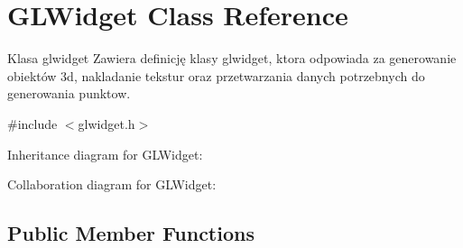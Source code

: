 \hypertarget{class_g_l_widget}{}\section{G\+L\+Widget Class Reference}
\label{class_g_l_widget}


Klasa glwidget Zawiera definicję klasy glwidget, ktora odpowiada za generowanie obiektów 3d, nakladanie tekstur oraz przetwarzania danych potrzebnych do generowania punktow.  




{\ttfamily \#include $<$glwidget.\+h$>$}



Inheritance diagram for G\+L\+Widget\+:


Collaboration diagram for G\+L\+Widget\+:
\subsection*{Public Member Functions}
